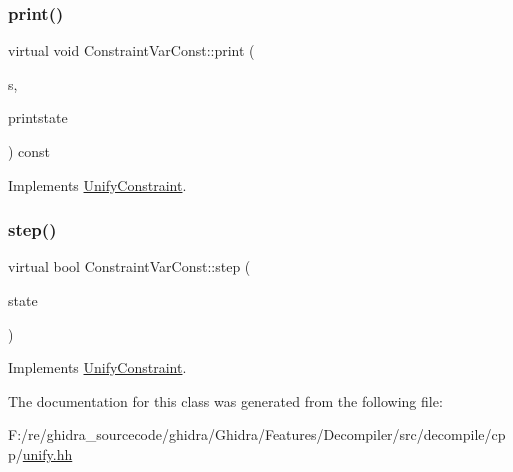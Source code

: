 \subsubsection{\texorpdfstring{print()}{print()}}
{\footnotesize\ttfamily virtual void Constraint\+Var\+Const\+::print (\begin{DoxyParamCaption}\item[{ostream \&}]{s,  }\item[{\mbox{\hyperlink{class_unify_c_printer}{Unify\+C\+Printer}} \&}]{printstate }\end{DoxyParamCaption}) const\hspace{0.3cm}{\ttfamily [virtual]}}



Implements \mbox{\hyperlink{class_unify_constraint_a774f6a611a96384766cb8e8d8f5ff41f}{Unify\+Constraint}}.

\mbox{\label{class_constraint_var_const_a2c4e5c53f16ad3a76ab6c54c850b3d5b}} 
\subsubsection{\texorpdfstring{step()}{step()}}
{\footnotesize\ttfamily virtual bool Constraint\+Var\+Const\+::step (\begin{DoxyParamCaption}\item[{\mbox{\hyperlink{class_unify_state}{Unify\+State}} \&}]{state }\end{DoxyParamCaption})\hspace{0.3cm}{\ttfamily [virtual]}}



Implements \mbox{\hyperlink{class_unify_constraint_ad9ab4ad91037f96bf803735d414d212d}{Unify\+Constraint}}.



The documentation for this class was generated from the following file\+:\begin{DoxyCompactItemize}
\item 
F\+:/re/ghidra\+\_\+sourcecode/ghidra/\+Ghidra/\+Features/\+Decompiler/src/decompile/cpp/\mbox{\hyperlink{unify_8hh}{unify.\+hh}}\end{DoxyCompactItemize}

